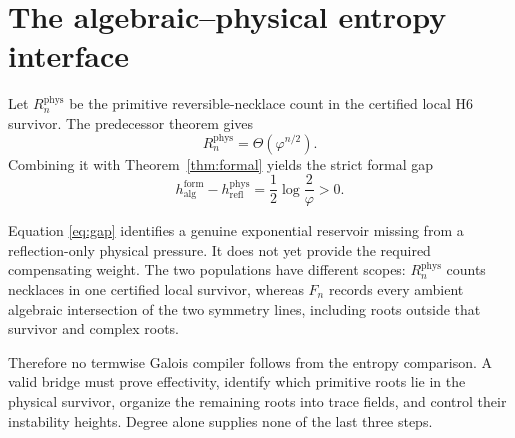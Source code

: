 \section{The algebraic--physical entropy interface}

Let $R_n^{\mathrm{phys}}$ be the primitive reversible-necklace count in the
certified local H6 survivor.  The predecessor theorem gives
\[
R_n^{\mathrm{phys}}=\Theta(\varphi^{n/2}).
\]
Combining it with Theorem~\ref{thm:formal} yields the strict formal gap
\begin{equation}\label{eq:gap}
h_{\mathrm{alg}}^{\mathrm{form}}-h_{\mathrm{refl}}^{\mathrm{phys}}
=\frac12\log\frac{2}{\varphi}>0.
\end{equation}

Equation \eqref{eq:gap} identifies a genuine exponential reservoir missing
from a reflection-only physical pressure.  It does not yet provide the
required compensating weight.  The two populations have different scopes:
$R_n^{\mathrm{phys}}$ counts necklaces in one certified local survivor,
whereas $F_n$ records every ambient algebraic intersection of the two
symmetry lines, including roots outside that survivor and complex roots.

Therefore no termwise Galois compiler follows from the entropy comparison.
A valid bridge must prove effectivity, identify which primitive roots lie in
the physical survivor, organize the remaining roots into trace fields, and
control their instability heights.  Degree alone supplies none of the last
three steps.
